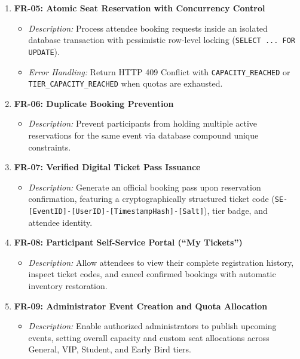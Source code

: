\documentclass[11pt,a4paper]{report}
\begin{document}
\begin{enumerate}[leftmargin=1.5em, itemsep=0.8em]
    \item \textbf{FR-05: Atomic Seat Reservation with Concurrency Control}
    \begin{itemize}[leftmargin=1.2em, itemsep=0.2em]
        \item \textit{Description:} Process attendee booking requests inside an isolated database transaction with pessimistic row-level locking (\texttt{SELECT ... FOR UPDATE}).
        \item \textit{Error Handling:} Return HTTP 409 Conflict with \texttt{CAPACITY\_REACHED} or \texttt{TIER\_CAPACITY\_REACHED} when quotas are exhausted.
    \end{itemize}

    \item \textbf{FR-06: Duplicate Booking Prevention}
    \begin{itemize}[leftmargin=1.2em, itemsep=0.2em]
        \item \textit{Description:} Prevent participants from holding multiple active reservations for the same event via database compound unique constraints.
    \end{itemize}

    \item \textbf{FR-07: Verified Digital Ticket Pass Issuance}
    \begin{itemize}[leftmargin=1.2em, itemsep=0.2em]
        \item \textit{Description:} Generate an official booking pass upon reservation confirmation, featuring a cryptographically structured ticket code (\texttt{SE-[EventID]-[UserID]-[TimestampHash]-[Salt]}), tier badge, and attendee identity.
    \end{itemize}

    \item \textbf{FR-08: Participant Self-Service Portal (``My Tickets'')}
    \begin{itemize}[leftmargin=1.2em, itemsep=0.2em]
        \item \textit{Description:} Allow attendees to view their complete registration history, inspect ticket codes, and cancel confirmed bookings with automatic inventory restoration.
    \end{itemize}

    \item \textbf{FR-09: Administrator Event Creation and Quota Allocation}
    \begin{itemize}[leftmargin=1.2em, itemsep=0.2em]
        \item \textit{Description:} Enable authorized administrators to publish upcoming events, setting overall capacity and custom seat allocations across General, VIP, Student, and Early Bird tiers.
    \end{itemize}


\end{enumerate}
\end{document}
